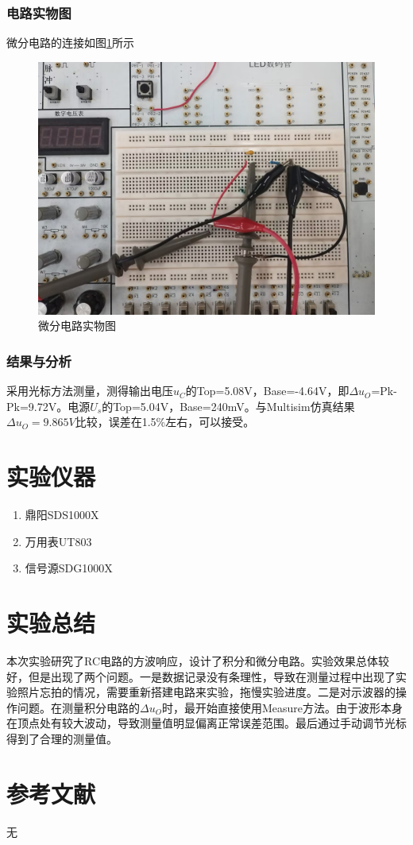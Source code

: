 \documentclass{ctexart}
\begin{document}
\subsubsection{电路实物图}
微分电路的连接如图\ref{fig:微分电路实物图}所示
\begin{figure}[!ht]
    \centering
    \includegraphics[scale=0.2]{pic/dif_cir.jpg}
    \caption{微分电路实物图}
    \label{fig:微分电路实物图}
\end{figure}
\subsubsection{结果与分析}
采用光标方法测量，测得输出电压$u_C$的Top=5.08V，Base=-4.64V，即$\Delta u_O$=Pk-Pk=9.72V。电源$U_s$的Top=5.04V，Base=240mV。与Multisim仿真结果$\Delta u_O= 9.865V$比较，误差在1.5\%左右，可以接受。
\section{实验仪器}
\begin{enumerate}
    \item 鼎阳SDS1000X
    \item 万用表UT803
    \item 信号源SDG1000X
\end{enumerate}
\section{实验总结}
本次实验研究了RC电路的方波响应，设计了积分和微分电路。实验效果总体较好，但是出现了两个问题。一是数据记录没有条理性，导致在测量过程中出现了实验照片忘拍的情况，需要重新搭建电路来实验，拖慢实验进度。二是对示波器的操作问题。在测量积分电路的$\Delta u_O$时，最开始直接使用Measure方法。由于波形本身在顶点处有较大波动，导致测量值明显偏离正常误差范围。最后通过手动调节光标得到了合理的测量值。
\section{参考文献}
无
\end{document}
